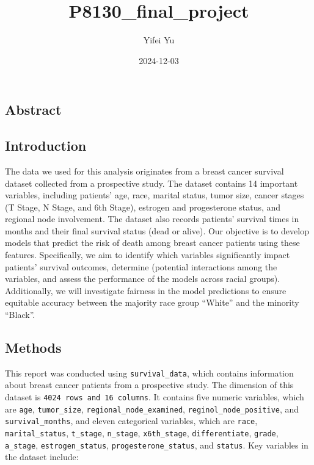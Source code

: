 \documentclass[
]{article}
\title{P8130\_final\_project}
\author{Yifei Yu}
\date{2024-12-03}
\begin{document}
\maketitle

{
\setcounter{tocdepth}{2}
\tableofcontents
}
\subsection{Abstract}\label{abstract}

\subsection{Introduction}\label{introduction}

The data we used for this analysis originates from a breast cancer survival dataset collected from a prospective study. The dataset contains 14 important variables, including patients' age, race, marital status, tumor size, cancer stages (T Stage, N Stage, and 6th Stage), estrogen and progesterone status, and regional node involvement. The dataset also records patients' survival times in months and their final survival status (dead or alive). Our objective is to develop models that predict the risk of death among breast cancer patients using these features. Specifically, we aim to identify which variables significantly impact patients' survival outcomes, determine (potential interactions among the variables, and assess the performance of the models across racial groups). Additionally, we will investigate fairness in the model predictions to ensure equitable accuracy between the majority race group ``White'' and the minority ``Black''.

\subsection{Methods}\label{methods}

This report was conducted using \texttt{survival\_data}, which contains information about breast cancer patients from a prospective study. The dimension of this dataset is \texttt{4024 rows and 16 columns}. It contains five numeric variables, which are \texttt{age}, \texttt{tumor\_size}, \texttt{regional\_node\_examined}, \texttt{reginol\_node\_positive}, and \texttt{survival\_months}, and eleven categorical variables, which are \texttt{race}, \texttt{marital\_status}, \texttt{t\_stage}, \texttt{n\_stage}, \texttt{x6th\_stage}, \texttt{differentiate}, \texttt{grade}, \texttt{a\_stage}, \texttt{estrogen\_status}, \texttt{progesterone\_status}, and \texttt{status}. Key variables in the dataset include:
\end{document}
